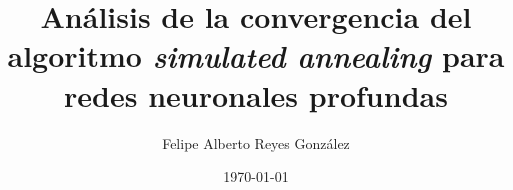 \documentclass[informe]{tesis-usach}
\title{Análisis de la convergencia del algoritmo {\em simulated annealing} para redes neuronales profundas}
\author{Felipe Alberto Reyes González}
\date{\today}
\begin{document}
\renewcommand{\contentsname}{Tabla de contenido}
\renewcommand{\refname}{Bibliografía}
\renewcommand{\appendixname}{Apéndice}
\renewcommand{\appendixtocname}{Apéndices}
\renewcommand{\appendixpagename}{Apéndices}
\renewcommand{\tablename}{Tabla}
\renewcommand{\BOthers}[1]{et al.\hbox{}}


\maketitle

%
\tableofcontents
\newpage






%


\newpage

%

% 


%
%

\end{document}
